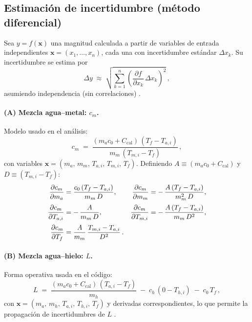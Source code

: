 \documentclass[11pt,twocolumn]{article}
\makeatletter
\let\orig@cite\cite
\renewcommand{\cite}[1]{\textcolor{Blue}{\orig@cite{#1}}}
\let\orig@parencite\parencite
\renewcommand{\parencite}[1]{\textcolor{Blue}{\orig@parencite{#1}}}
\renewcommand{\cite}[1]{\parencite{#1}}      %
\let\orig@cite\cite
\renewcommand{\cite}[1]{\textcolor{Blue}{\orig@cite{#1}}} %
\makeatother
\begin{document}
\subsection{Estimación de incertidumbre (método diferencial)}
Sea $y=f(\boldsymbol{x})$ una magnitud calculada a partir de variables de entrada
independientes $\boldsymbol{x}=(x_1,\dots,x_n)$, cada una con incertidumbre estándar
$\Delta x_k$. Su incertidumbre se estima por
\begin{equation*}
    \Delta y \;\approx\; \sqrt{\sum_{k=1}^n \left(\frac{\partial f}{\partial x_k}\,\Delta x_k\right)^{\!2}}\,,
\end{equation*}
asumiendo independencia (sin correlaciones) \cite{taylor_error}. 

\paragraph{(A) Mezcla agua–metal: $c_m$.}
Modelo usado en el análisis:
\begin{equation*}
    c_m \;=\; \frac{(m_a c_0 + C_{\text{cal}})\,(T_f - T_{a,i})}{m_m\,(T_{m,i} - T_f)}\,,
\end{equation*}
con variables $\boldsymbol{x}=(m_a,\,m_m,\,T_{a,i},\,T_{m,i},\,T_f)$. Definiendo 
$A \equiv (m_a c_0 + C_{\text{cal}})$ y $D \equiv (T_{m,i}-T_f)$:
\begin{align*}
    \pdv{c_m}{m_a} &= \frac{c_0\,(T_f - T_{a,i})}{m_m\,D}, 
    &
    \pdv{c_m}{m_m} &= -\,\frac{A\,(T_f - T_{a,i})}{m_m^{2}\,D}, \\[2pt]
    \pdv{c_m}{T_{a,i}} &= -\,\frac{A}{m_m\,D}, 
    &
    \pdv{c_m}{T_{m,i}} &= -\,\frac{A\,(T_f - T_{a,i})}{m_m\,D^{2}}, \\[2pt]
    \pdv{c_m}{T_f} &= \frac{A}{m_m}\,\frac{T_{m,i}-T_{a,i}}{D^{2}}\,.
\end{align*}

\paragraph{(B) Mezcla agua–hielo: $L$.}
Forma operativa usada en el código:
\begin{equation*}
    L \;=\; \frac{(m_a c_0 + C_{\text{cal}})\,(T_{a,i}-T_f)}{m_h}
    \;-\; c_h\,(0 - T_{h,i}) \;-\; c_0\,T_f\,,
\end{equation*}
con $\boldsymbol{x}=(m_a,\,m_h,\,T_{a,i},\,T_{h,i},\,T_f)$ y derivadas correspondientes,
lo que permite la propagación de incertidumbres de $L$ \cite{taylor_error}.
\end{document}
